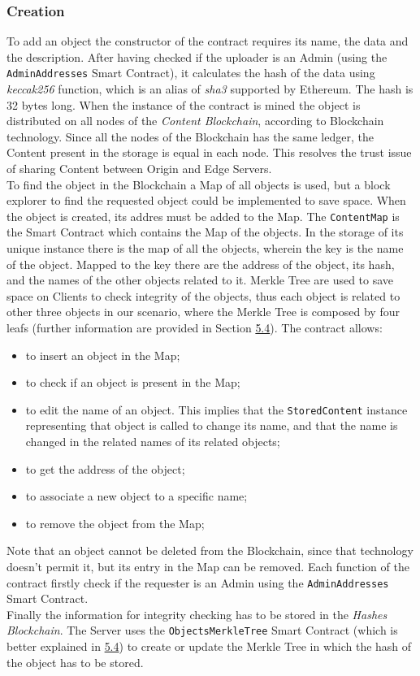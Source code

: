 \documentclass[hidelinks,conference,compsoc]{IEEEtran}
\begin{document}
\subsubsection{Creation}To add an object the constructor of the contract requires its name, the data and the description. After having checked if the uploader is an Admin (using the \texttt{AdminAddresses} Smart Contract), it calculates the hash of the data using \textit{keccak256} function, which is an alias of \textit{sha3} supported by Ethereum. The hash is 32 bytes long. When the instance of the contract is mined the object is distributed on all nodes of the \textit{Content Blockchain}, according to Blockchain technology. Since all the nodes of the Blockchain has the same ledger, the Content present in the storage is equal in each node. This resolves the trust issue of sharing Content between Origin and Edge Servers.
\\To find the object in the Blockchain a Map of all objects is used, but a block explorer to find the requested object could be implemented to save space. When the object is created, its addres must be added to the Map. The \texttt{ContentMap}
is the Smart Contract which contains the Map of the objects. In the storage of its unique instance there is the map of all the objects, wherein the key is the name of the object. Mapped to the key there are the address of the object, its hash, and the names of the other objects related to it. Merkle Tree are used to save space on Clients to check integrity of the objects, thus each object is related to other three objects in our scenario, where the Merkle Tree is composed by four leafs (further information are provided in Section \hyperref[sec:Clienthashes]{5.4}). The contract allows:
\begin{itemize}
	\item to insert an object in the Map;
	\item to check if an object is present in the Map;
	\item to edit the name of an object. This implies that the \texttt{StoredContent} instance representing that object is called to change its name, and that the name is changed in the related names of its related objects;
	\item to get the address of the object;
	\item to associate a new object to a specific name;
	\item to remove the object from the Map;
\end{itemize} 
Note that an object cannot be deleted from the Blockchain, since that technology doesn't permit it, but its entry in the Map can be removed.
Each function of the contract firstly check if the requester is an Admin using the \texttt{AdminAddresses} Smart Contract.\\
Finally the information for integrity checking has to be stored in the \textit{Hashes Blockchain}. The Server uses the \texttt{ObjectsMerkleTree} Smart Contract (which is better explained in \hyperref[sec:Clienthashes]{5.4}) to create or update the Merkle Tree in which the hash of the object has to be stored.
\end{document}
